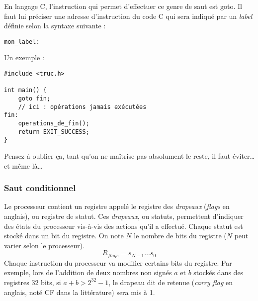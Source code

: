 \documentclass[../../../main.tex]{subfiles}
\begin{document}
En langage C, l'instruction qui permet d'effectuer ce genre de saut est \textsf{goto}. Il faut lui préciser une adresse d'instruction du code C qui sera indiqué par un \textit{label} définie selon la syntaxe suivante :
\begin{verbatim}
mon_label:
\end{verbatim}
Un exemple :
\begin{verbatim}
#include <truc.h>

int main() {
	goto fin;
	// ici : opérations jamais exécutées
fin:
	operations_de_fin();
	return EXIT_SUCCESS;
}
\end{verbatim}
Pensez à oublier ça, tant qu'on ne maîtrise pas absolument le reste, il faut éviter\dots et même là\dots
 
\subsubsection{Saut conditionnel}
\label{ssub:saut_conditionnel}
Le processeur contient un registre appelé le registre des \textit{drapeaux} (\textit{flags} en anglais), ou registre de statut. Ces \textit{drapeaux}, ou statuts, permettent d'indiquer des états du processeur vis-à-vis des actions qu'il a effectué. Chaque statut est stocké dans un bit du registre. On note $N$ le nombre de bits du registre ($N$ peut varier selon le processeur).
$$R_{flags} = s_{N-1}\dots s_{0}$$
Chaque instruction du processeur va modifier certains bits du registre. Par exemple, lors de l'addition de deux nombres non signés $a$ et $b$ stockés dans des registres 32 bits, si $a + b > 2^{32} - 1$, le drapeau dit de retenue (\textit{carry flag} en anglais, noté CF dans la littérature) sera mis à 1.
 
\end{document}

